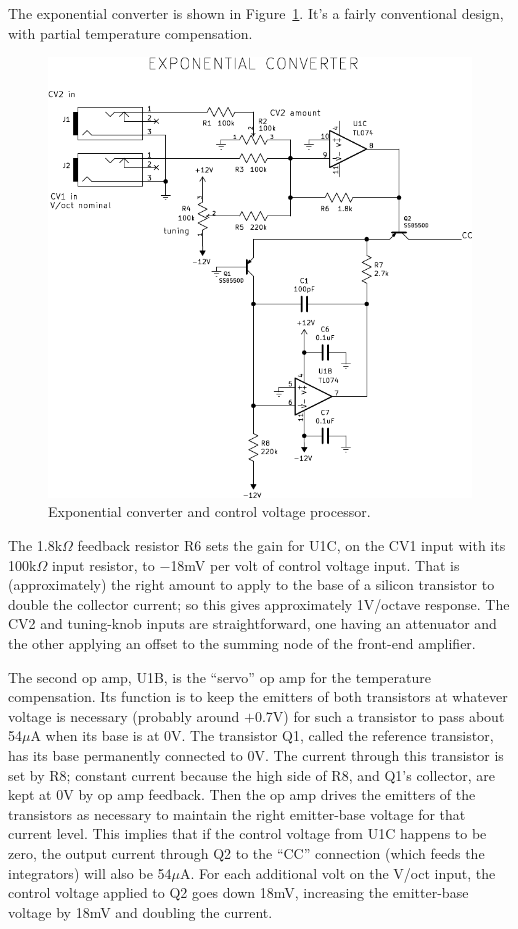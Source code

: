 The exponential converter is shown in Figure~\ref{fig:expoconv}.  It's a
fairly conventional design, with partial temperature compensation.

\begin{figure}
\centering\includegraphics[width=\linewidth]{expoconv.pdf}\par
\caption{Exponential converter and control voltage
processor.}\label{fig:expoconv}
\end{figure}

The 1.8k$\Omega$ feedback resistor R6 sets the gain for U1C, on the CV1
input with its 100k$\Omega$ input resistor, to $-$18mV per volt of control
voltage input.  That is (approximately) the right amount to apply to the
base of a silicon transistor to double the collector current; so this gives
approximately 1V/octave response.  The CV2 and tuning-knob inputs are
straightforward, one having an attenuator and the other applying an offset
to the summing node of the front-end amplifier.

The second op amp, U1B, is the ``servo'' op amp for the temperature
compensation.  Its function is to keep the emitters of both transistors at
whatever voltage is necessary (probably around $+$0.7V) for such a
transistor to pass about 54$\mu$A when its base is at 0V.  The transistor
Q1, called the reference transistor, has its base permanently connected to
0V.  The current through this transistor is set by R8; constant current
because the high side of R8, and Q1's collector, are kept at 0V by op amp
feedback.  Then the op amp drives the emitters of the transistors as
necessary to maintain the right emitter-base voltage for that current level. 
This implies that if the control voltage from U1C happens to be zero, the
output current through Q2 to the ``CC'' connection (which feeds the
integrators) will also be 54$\mu$A.  For each additional volt on the V/oct
input, the control voltage applied to Q2 goes down 18mV, increasing the
emitter-base voltage by 18mV and doubling the current.

